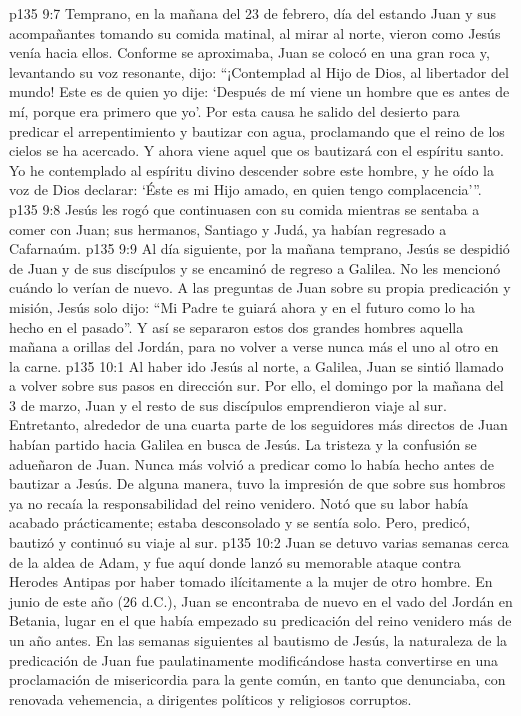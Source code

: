 \vs p135 9:7 \pc Temprano, en la mañana del 23 de febrero, día del  estando Juan y sus acompañantes tomando su comida matinal, al mirar al norte, vieron como Jesús venía hacia ellos. Conforme se aproximaba, Juan se colocó en una gran roca y, levantando su voz resonante, dijo: “¡Contemplad al Hijo de Dios, al libertador del mundo! Este es de quien yo dije: ‘Después de mí viene un hombre que es antes de mí, porque era primero que yo’. Por esta causa he salido del desierto para predicar el arrepentimiento y bautizar con agua, proclamando que el reino de los cielos se ha acercado. Y ahora viene aquel que os bautizará con el espíritu santo. Yo he contemplado al espíritu divino descender sobre este hombre, y he oído la voz de Dios declarar: ‘Éste es mi Hijo amado, en quien tengo complacencia’”.
\vs p135 9:8 Jesús les rogó que continuasen con su comida mientras se sentaba a comer con Juan; sus hermanos, Santiago y Judá, ya habían regresado a Cafarnaúm.
\vs p135 9:9 \pc Al día siguiente, por la mañana temprano, Jesús se despidió de Juan y de sus discípulos y se encaminó de regreso a Galilea. No les mencionó cuándo lo verían de nuevo. A las preguntas de Juan sobre su propia predicación y misión, Jesús solo dijo: “Mi Padre te guiará ahora y en el futuro como lo ha hecho en el pasado”. Y así se separaron estos dos grandes hombres aquella mañana a orillas del Jordán, para no volver a verse nunca más el uno al otro en la carne.
\vs p135 10:1 Al haber ido Jesús al norte, a Galilea, Juan se sintió llamado a volver sobre sus pasos en dirección sur. Por ello, el domingo por la mañana del 3 de marzo, Juan y el resto de sus discípulos emprendieron viaje al sur. Entretanto, alrededor de una cuarta parte de los seguidores más directos de Juan habían partido hacia Galilea en busca de Jesús. La tristeza y la confusión se adueñaron de Juan. Nunca más volvió a predicar como lo había hecho antes de bautizar a Jesús. De alguna manera, tuvo la impresión de que sobre sus hombros ya no recaía la responsabilidad del reino venidero. Notó que su labor había acabado prácticamente; estaba desconsolado y se sentía solo. Pero, predicó, bautizó y continuó su viaje al sur.
\vs p135 10:2 Juan se detuvo varias semanas cerca de la aldea de Adam, y fue aquí donde lanzó su memorable ataque contra Herodes Antipas por haber tomado ilícitamente a la mujer de otro hombre. En junio de este año (26 d.C.), Juan se encontraba de nuevo en el vado del Jordán en Betania, lugar en el que había empezado su predicación del reino venidero más de un año antes. En las semanas siguientes al bautismo de Jesús, la naturaleza de la predicación de Juan fue paulatinamente modificándose hasta convertirse en una proclamación de misericordia para la gente común, en tanto que denunciaba, con renovada vehemencia, a dirigentes políticos y religiosos corruptos.
